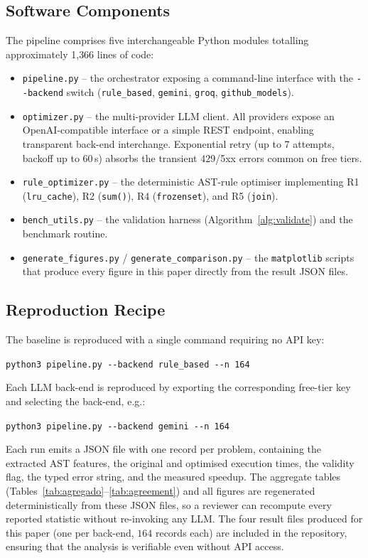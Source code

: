 \documentclass[conference]{IEEEtran}
\begin{document}
\subsection{Software Components}
The pipeline comprises five interchangeable Python modules totalling approximately 1{,}366 lines of code:
\begin{itemize}
  \item \texttt{pipeline.py} -- the orchestrator exposing a command-line interface with the \texttt{-{}-backend} switch (\texttt{rule\_based}, \texttt{gemini}, \texttt{groq}, \texttt{github\_models}).
  \item \texttt{optimizer.py} -- the multi-provider LLM client. All providers expose an OpenAI-compatible interface or a simple REST endpoint, enabling transparent back-end interchange. Exponential retry (up to 7 attempts, backoff up to 60\,s) absorbs the transient 429/5xx errors common on free tiers.
  \item \texttt{rule\_optimizer.py} -- the deterministic AST-rule optimiser implementing R1 (\texttt{lru\_cache}), R2 (\texttt{sum()}), R4 (\texttt{frozenset}), and R5 (\texttt{join}).
  \item \texttt{bench\_utils.py} -- the validation harness (Algorithm~\ref{alg:validate}) and the benchmark routine.
  \item \texttt{generate\_figures.py} / \texttt{generate\_comparison.py} -- the \texttt{matplotlib} scripts that produce every figure in this paper directly from the result JSON files.
\end{itemize}

\subsection{Reproduction Recipe}
The baseline is reproduced with a single command requiring no API key:
\begin{center}
\texttt{\scriptsize python3 pipeline.py -{}-backend rule\_based -{}-n 164}
\end{center}
Each LLM back-end is reproduced by exporting the corresponding free-tier key and selecting the back-end, e.g.:
\begin{center}
\texttt{\scriptsize python3 pipeline.py -{}-backend gemini -{}-n 164}
\end{center}
Each run emits a JSON file with one record per problem, containing the extracted AST features, the original and optimised execution times, the validity flag, the typed error string, and the measured speedup. The aggregate tables (Tables~\ref{tab:agregado}--\ref{tab:agreement}) and all figures are regenerated deterministically from these JSON files, so a reviewer can recompute every reported statistic without re-invoking any LLM. The four result files produced for this paper (one per back-end, $164$ records each) are included in the repository, ensuring that the analysis is verifiable even without API access.
\end{document}
